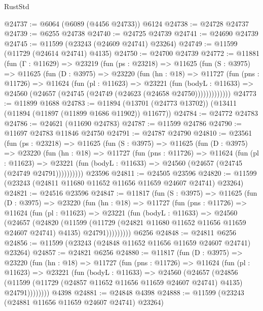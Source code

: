 \begin{lexlean}{RustStd}
\begin{coremodule}
@24737 := @6064 (@6089 (@4456 @24733)) @6124
@24738 := @24728 @24737
@24739 := @6255 @24738
@24740 := @24725 @24739
@24741 := @24690 @24739
@24745 := @11599 (@23243 (@24609 @24741) @23264)
@24749 := @11599 (@11729 (@24614 @24741) @4135)
@24750 := @24700 @24739
@24772 := @11881
    (fun (Γ : @11629) =>
    @23219
      (fun (ps : @23218) =>
      @11625
        (fun (S : @3975) =>
        @11625
          (fun (D : @3975) =>
          @23220
            (fun (hn : @18) =>
            @11727
              (fun (pns : @11726) =>
              @11624
                (fun (pl : @11623) =>
                @23221
                  (fun (bodyL : @11633) =>
                  @24560 (@24657 (@24745 (@24749 (@24623 (@24658 @24750)))))))))))))
@24773 := @11899 @1688
@24783 := @11894 (@13701 (@24773 @13702)) (@13411 (@11894 (@11897 (@11899 @1686 @11902)) @11677))
@24784 := @24772 @24783
@24786 := @24621 (@11690 @24783)
@24787 := @11599 @24786
@24790 := @11697 @24783 @11846 @24750
@24791 := @24787 @24790
@24810 := @23561
    (fun (ps : @23218) =>
    @11625
      (fun (S : @3975) =>
      @11625
        (fun (D : @3975) =>
        @23220
          (fun (hn : @18) =>
          @11727
            (fun (pns : @11726) =>
            @11624
              (fun (pl : @11623) =>
              @23221 (fun (bodyL : @11633) => @24560 (@24657 (@24745 (@24749 @24791))))))))))
    @23596
@24811 := @24505 @23596
@24820 := @11599 (@23243 (@24811 @11680 @11652 @11656 @11659 @24607 @24741) @23264)
@24821 := @24516 @23596
@24847 := @11817
    (fun (S : @3975) =>
    @11625
      (fun (D : @3975) =>
      @23220
        (fun (hn : @18) =>
        @11727
          (fun (pns : @11726) =>
          @11624
            (fun (pl : @11623) =>
            @23221
              (fun (bodyL : @11633) =>
              @24560
                (@24657
                  (@24820
                    (@11599
                      (@11729 (@24821 @11680 @11652 @11656 @11659 @24607 @24741) @4135)
                      @24791)))))))))
    @6256
@24848 := @24811 @6256
@24856 := @11599 (@23243 (@24848 @11652 @11656 @11659 @24607 @24741) @23264)
@24857 := @24821 @6256
@24880 := @11817
    (fun (D : @3975) =>
    @23220
      (fun (hn : @18) =>
      @11727
        (fun (pns : @11726) =>
        @11624
          (fun (pl : @11623) =>
          @23221
            (fun (bodyL : @11633) =>
            @24560
              (@24657
                (@24856
                  (@11599 (@11729 (@24857 @11652 @11656 @11659 @24607 @24741) @4135) @24791))))))))
    @4398
@24881 := @24848 @4398
@24888 := @11599 (@23243 (@24881 @11656 @11659 @24607 @24741) @23264)

\end{coremodule}
\end{lexlean}
